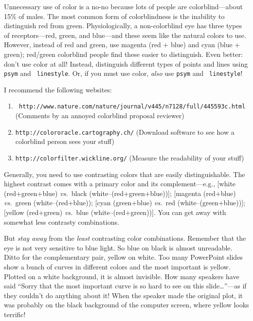 \documentclass[psfig,preprint]{aastex}
\begin{document}
Unnecessary use of
color is a no-no because lots of people are colorblind---about 15\% of
males. The most common form of colorblindness is the inability to
distinguish red from green. Physiologically, a non-colorblind eye has
three types of receptors---red, green, and blue---and these seem like
the natural colors to use. However, instead of red and green, use
magenta (red + blue) and cyan (blue + green); red/green colorblind
people find these easier to distinguish. Even better: don't use color at
all! Instead, distinguish
different types of points and lines using {\tt psym} and {\tt
  linestyle}. Or, if you must use color, {\it also} use {\tt psym} and {\tt
  linestyle}!

I recommend the following websites: \begin{enumerate}

\item {\tt
  http://www.nature.com/nature/journal/v445/n7128/full/445593c.html} 
        (Comments by an annoyed colorblind proposal reviewer)

\item {\tt http://colororacle.cartography.ch/}
        (Download software to see how a colorblind person sees your stuff)

\item {\tt http://colorfilter.wickline.org/}
        (Measure the readability of your stuff)
\end{enumerate}

Generally, you need to use contrasting colors that are easily
distinguishable. The highest contrast comes with a primary color and its
complement---e.g., [white (red+green+blue) {\it vs.}\ black
  (white--(red+green+blue))]; [magenta (red+blue) {\it vs.}\ green
(white--(red+blue)); [cyan (green+blue) {\it vs.}\ red
  (white--(green+blue))]; [yellow (red+green) {\it vs.}\ blue
  (white--(red+green))].  You can get away with somewhat less contrasty
combinations.

But {\it stay away} from the {\it least} contrasting color
combinations. Remember that the eye is not very sensitive to blue
light. So blue on black is almost unreadable. Ditto for the
complementary pair, yellow on white. Too many PowerPoint slides show a
bunch of curves in different colors and the most important is
yellow. Plotted on a white background, it is almost invisible. How many
speakers have said ``Sorry that the most important curve is so hard to
see on this slide\dots''---as if they couldn't do anything about it!
When the speaker made the original plot, it was probably on the black
background of the computer screen, where yellow looks terrific!
\end{document}
